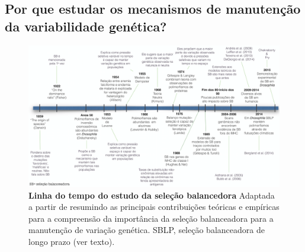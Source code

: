 \begin{refsection}

	
\subsection{\label{sub:VariacoesGeneticas}Por que estudar os mecanismos de manutenção da variabilidade genética?}%
\begin{figure} 
\includegraphics{chap1_folder/Figures/Figura_linha_do_tempo_v2.png}
\caption{\textbf{Linha do tempo do estudo da seleção balancedora} Adaptada a partir de \textcite{Gloss2016} resumindo as principais contribuições teóricas e empíricas para a compreensão da importância da seleção balanceadora para a manutenção de variação genética. SBLP, seleção balanceadora de longo prazo (ver texto).} %
\label{fig:LinhadoTempo}
\end{figure} 
%


\end{refsection}
